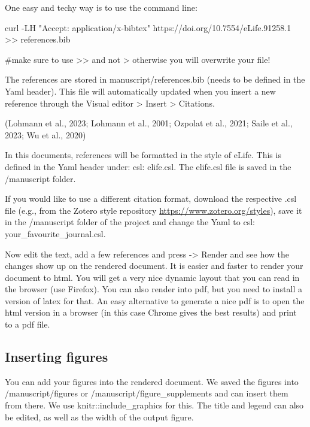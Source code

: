 \documentclass[
  11pt,
]{article}
\newenvironment{Shaded}{\begin{snugshade}}{\end{snugshade}}
\newcommand{\AttributeTok}[1]{\textcolor[rgb]{0.40,0.45,0.13}{#1}}
\newcommand{\CommentTok}[1]{\textcolor[rgb]{0.37,0.37,0.37}{#1}}
\newcommand{\ExtensionTok}[1]{\textcolor[rgb]{0.00,0.23,0.31}{#1}}
\newcommand{\NormalTok}[1]{\textcolor[rgb]{0.00,0.23,0.31}{#1}}
\newcommand{\OperatorTok}[1]{\textcolor[rgb]{0.37,0.37,0.37}{#1}}
\newcommand{\StringTok}[1]{\textcolor[rgb]{0.13,0.47,0.30}{#1}}
\begin{document}
One easy and techy way is to use the command line:

\begin{Shaded}
\begin{Highlighting}[]
\ExtensionTok{curl} \AttributeTok{{-}LH} \StringTok{"Accept: application/x{-}bibtex"}\NormalTok{ https://doi.org/10.7554/eLife.91258.1 }\OperatorTok{\textgreater{}\textgreater{}}\NormalTok{ references.bib}

\CommentTok{\#make sure to use \textgreater{}\textgreater{} and not \textgreater{} otherwise you will overwrite your file!}
\end{Highlighting}
\end{Shaded}

The references are stored in manuscript/references.bib (needs to be
defined in the Yaml header). This file will automatically updated when
you insert a new reference through the Visual editor \textgreater{}
Insert \textgreater{} Citations.

(Lohmann et al., 2023; Lohmann et al., 2001; Ozpolat et al., 2021; Saile
et al., 2023; Wu et al., 2020)

In this documents, references will be formatted in the style of eLife.
This is defined in the Yaml header under: csl: elife.csl. The elife.csl
file is saved in the /manuscript folder.

If you would like to use a different citation format, download the
respective .csl file (e.g., from the Zotero style repository
\url{https://www.zotero.org/styles}), save it in the /manuscript folder
of the project and change the Yaml to csl: your\_favourite\_journal.csl.

Now edit the text, add a few references and press -\textgreater{} Render
and see how the changes show up on the rendered document. It is easier
and faster to render your document to html. You will get a very nice
dynamic layout that you can read in the browser (use Firefox). You can
also render into pdf, but you need to install a version of latex for
that. An easy alternative to generate a nice pdf is to open the html
version in a browser (in this case Chrome gives the best results) and
print to a pdf file.

\subsection{Inserting figures}\label{inserting-figures}

You can add your figures into the rendered document. We saved the
figures into /manuscript/figures or /manuscript/figure\_supplements and
can insert them from there. We use knitr::include\_graphics for this.
The title and legend can also be edited, as well as the width of the
output figure.
\end{document}
